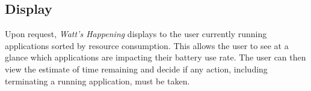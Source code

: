 \subsection{Display} %
Upon request, \emph{Watt's Happening} displays to the user currently running applications sorted by resource consumption.
This allows the user to see at a glance which applications are impacting their battery use rate. %
The user can then view the estimate of time remaining and decide if any action, including terminating a running application, must be taken.
